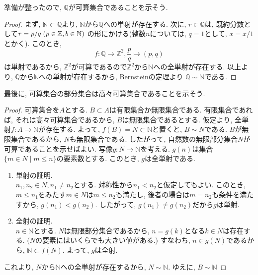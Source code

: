             準備が整ったので, $\mathbb{Q}$が可算集合であることを示そう.
            \begin{proof}
                まず, $\mathbb{N}\subset \mathbb{Q}$より, $\mathbb{N}$から$\mathbb{Q}$への単射が存在する. 次に, $r\in \mathbb{Q}$は, 既約分数として$r=p/q\hspace{1mm}(p\in\mathbb{Z},b\in\mathbb{N})$
                の形にかける(整数$n$については, $q=1$として, $x=x/1$とかく). このとき, 
                \begin{equation*}
                    f:\mathbb{Q}\rightarrow\mathbb{Z}^2,\frac{p}{q}\mapsto (p,q)
                \end{equation*}
                は単射であるから, $\mathbb{Z}^2$が可算であるので$\mathbb{Z}^2$から$\mathbb{N}$への全単射が存在する. 以上より, $\mathbb{Q}$から$\mathbb{N}$への単射が存在するから, Bernsteinの定理より
                $\mathbb{Q}\sim \mathbb{N}$である.
            \end{proof}
            \clearpage
            最後に, 可算集合の部分集合は高々可算集合であることを示そう.
            \begin{proof}
                可算集合を$A$とする. $B\subset A$は有限集合か無限集合である. 有限集合であれば, それは高々可算集合であるから, $B$は無限集合であるとする.
                仮定より, 全単射$f:A\rightarrow \mathbb{N}$が存在する. よって, $f(B)=N\subset \mathbb{N}$と置くと, $B\sim N$である.
                $B$が無限集合であるから, $N$も無限集合である. したがって, 自然数の無限部分集合$N$が可算であることを示せばよい.
                写像$g:N\rightarrow\mathbb{N}$を考える. $g(n)$は集合$\{m\in N\mid m\leq n\}$の要素数とする. このとき, $g$は全単射である.
                \begin{enumerate}
                    \item 単射の証明.\\
                    $n_1,n_2\in N,n_1\neq n_2$とする. 対称性から$n_1<n_2$と仮定してもよい. このとき, $m\leq n_1$をみたす$m\in N$は$m\leq n_2$も満たし, 
                    後者の場合は$m=n_2$も条件を満たすから, $g(n_1)<g(n_2)$. したがって, $g(n_1)\neq g(n_2)$だから$g$は単射.
                    \item 全射の証明.\\
                    $n\in \mathbb{N}$とする. $N$は無限部分集合であるから, $n=g(k)$となる$k\in N$は存在する. ($N$の要素にはいくらでも大きい値がある.)
                    すなわち, $n\in g(N)$であるから, $\mathbb{N}\subset f(N)$. よって, $g$は全射.
                \end{enumerate}
                これより, $N$から$\mathbb{N}$への全単射が存在するから, $N\sim\mathbb{N}$. ゆえに, $B\sim \mathbb{N}$
            \end{proof}

